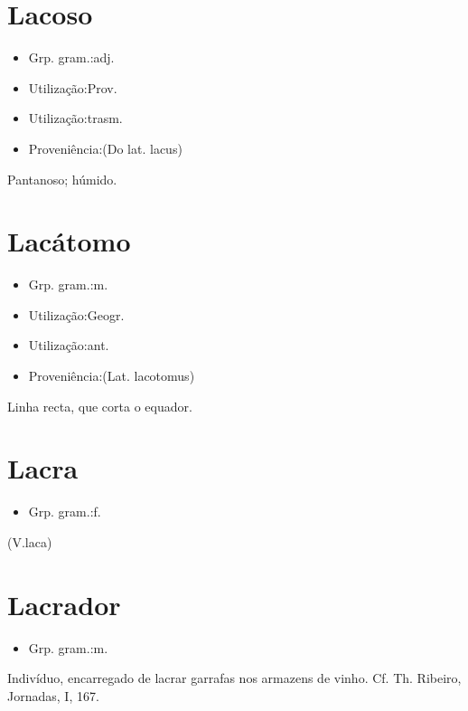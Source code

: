 \section{Lacoso}
\begin{itemize}
\item {Grp. gram.:adj.}
\end{itemize}
\begin{itemize}
\item {Utilização:Prov.}
\end{itemize}
\begin{itemize}
\item {Utilização:trasm.}
\end{itemize}
\begin{itemize}
\item {Proveniência:(Do lat. \textunderscore lacus\textunderscore )}
\end{itemize}
Pantanoso; húmido.
\section{Lacátomo}
\begin{itemize}
\item {Grp. gram.:m.}
\end{itemize}
\begin{itemize}
\item {Utilização:Geogr.}
\end{itemize}
\begin{itemize}
\item {Utilização:ant.}
\end{itemize}
\begin{itemize}
\item {Proveniência:(Lat. \textunderscore lacotomus\textunderscore )}
\end{itemize}
Linha recta, que corta o equador.
\section{Lacra}
\begin{itemize}
\item {Grp. gram.:f.}
\end{itemize}
(V.laca)
\section{Lacrador}
\begin{itemize}
\item {Grp. gram.:m.}
\end{itemize}
Indivíduo, encarregado de lacrar garrafas nos armazens de vinho. Cf. Th. Ribeiro, \textunderscore Jornadas\textunderscore , I, 167.
